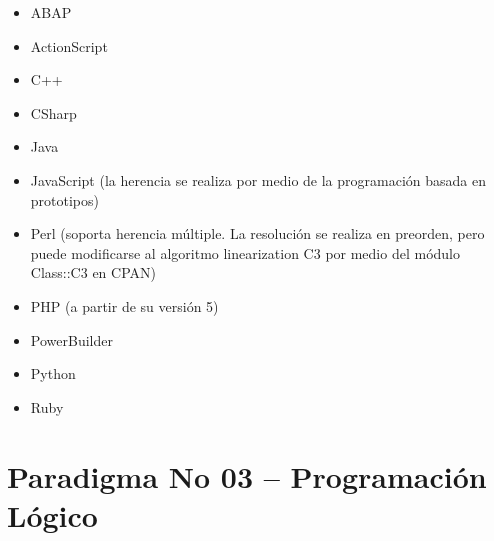 \begin{enumerate}[1.]
\begin {itemize}
\item ABAP
\item ActionScript
\item C++
\item CSharp
\item Java
\item JavaScript (la herencia se realiza por medio de la programación basada en prototipos)
\item Perl (soporta herencia múltiple. La resolución se realiza en preorden, pero puede modificarse al algoritmo linearization C3 por medio del módulo Class::C3 en CPAN)
\item PHP (a partir de su versión 5)
\item PowerBuilder
\item Python
\item Ruby
\end{itemize}









\end{enumerate}



\section{Paradigma No 03 – Programación Lógico} 

